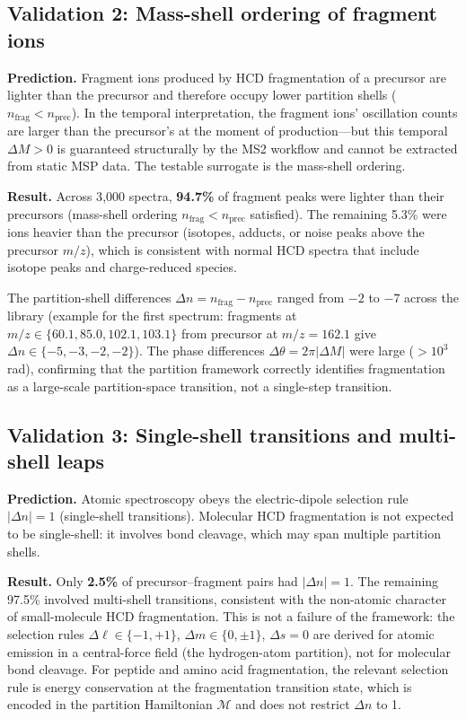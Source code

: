 \documentclass[twocolumn,10pt,a4paper]{article}
\theoremstyle{thmstyle}
\theoremstyle{definition}
\theoremstyle{remark}
\begin{document}
\subsection{Validation 2: Mass-shell ordering of fragment ions}

\textbf{Prediction.} Fragment ions produced by HCD fragmentation of a
precursor are lighter than the precursor and therefore occupy lower
partition shells ($n_{\text{frag}} < n_{\text{prec}}$). In the temporal
interpretation, the fragment ions' oscillation counts are larger than
the precursor's at the moment of production---but this temporal $\Delta M >
0$ is guaranteed structurally by the MS2 workflow and cannot be
extracted from static MSP data. The testable surrogate is the mass-shell
ordering.

\textbf{Result.} Across 3{,}000 spectra, \textbf{94.7\%} of fragment
peaks were lighter than their precursors (mass-shell ordering
$n_{\text{frag}} < n_{\text{prec}}$ satisfied). The remaining 5.3\% were
ions heavier than the precursor (isotopes, adducts, or noise peaks
above the precursor $m/z$), which is consistent with normal HCD spectra
that include isotope peaks and charge-reduced species.

The partition-shell differences $\Delta n = n_{\text{frag}} - n_{\text{prec}}$
ranged from $-2$ to $-7$ across the library (example for the first spectrum:
fragments at $m/z \in \{60.1, 85.0, 102.1, 103.1\}$ from precursor at
$m/z = 162.1$ give $\Delta n \in \{-5, -3, -2, -2\}$). The phase
differences $\Delta\theta = 2\pi|\Delta M|$ were large ($> 10^3$\,rad),
confirming that the partition framework correctly identifies fragmentation
as a large-scale partition-space transition, not a single-step transition.

\subsection{Validation 3: Single-shell transitions and multi-shell leaps}

\textbf{Prediction.} Atomic spectroscopy obeys the electric-dipole
selection rule $|\Delta n| = 1$ (single-shell transitions). Molecular
HCD fragmentation is not expected to be single-shell: it involves
bond cleavage, which may span multiple partition shells.

\textbf{Result.} Only \textbf{2.5\%} of precursor--fragment pairs had
$|\Delta n| = 1$. The remaining 97.5\% involved multi-shell transitions,
consistent with the non-atomic character of small-molecule HCD
fragmentation. This is not a failure of the framework: the selection
rules $\Delta\ell \in \{-1, +1\}$, $\Delta m \in \{0, \pm 1\}$,
$\Delta s = 0$ are derived for atomic emission in a central-force field
(the hydrogen-atom partition), not for molecular bond cleavage. For
peptide and amino acid fragmentation, the relevant selection rule is
energy conservation at the fragmentation transition state, which is
encoded in the partition Hamiltonian $\mathcal{M}$ and does not restrict
$\Delta n$ to 1.
\end{document}
